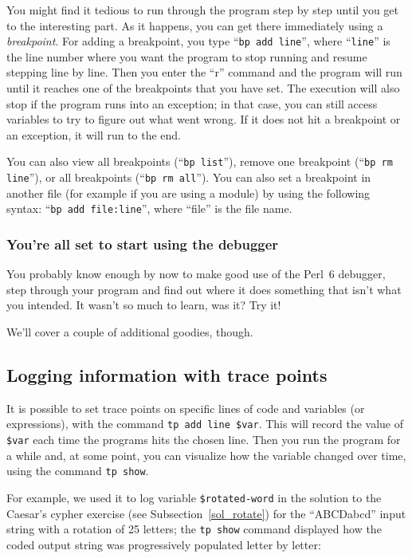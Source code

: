 You might find it tedious to run through the program step 
by step until you get to the interesting part. As it happens, 
you can get there immediately using a \emph{breakpoint}. For 
adding a breakpoint, you type ``{\tt bp add line}'', where 
``{\tt line}'' 
is the line number where you want the program to stop running 
and resume stepping line by line. Then you enter the ``r'' 
command and the program will run until it reaches one of the 
breakpoints that you have set. The execution will also 
stop if the program runs into an exception; in that case, 
you can still access variables to try to figure out what went 
wrong. If it does not hit a breakpoint or an exception, it 
will run to the end.

You can also view all breakpoints (``{\tt bp list}''), remove 
one breakpoint (``{\tt bp rm line}''), or all breakpoints 
(``{\tt bp rm all}''). You can also set a breakpoint in 
another file (for example if you are using a module) by 
using the following syntax: ``{\tt bp add file:line}'', where 
``file'' is the file name.

\subsubsection{You're all set to start using the debugger}

You probably know enough by now to make good use of the Perl~6 
debugger, step through your program and find out where it 
does something that isn't what you intended. It wasn't so 
much to learn, was it? Try it!

We'll cover a couple of additional goodies, though. 

\subsection{Logging information with trace points}

It is possible to set trace points on specific lines of code 
and variables (or expressions), with the command {\tt tp add 
line \$var}. This will record the value of \verb'$var' each 
time the programs hits the chosen line. Then you run the program 
for a while and, at some point, you can visualize how the 
variable changed over time, using the command {\tt tp show}.

For example, we used it to log variable \verb'$rotated-word' 
in the solution to the Caesar's cypher exercise 
(see Subsection~\ref{sol_rotate}) for the 
``ABCDabcd'' input string with a rotation of 25 letters; 
the {\tt tp show} command displayed how the coded output 
string was progressively populated letter by letter:

